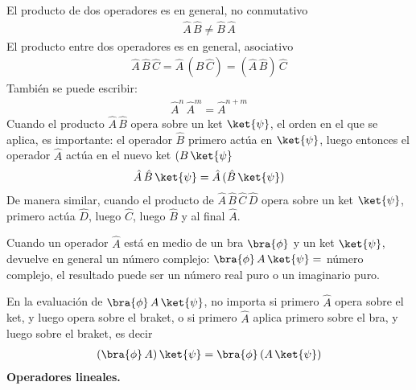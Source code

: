 El producto de dos operadores es en general, no conmutativo
\begin{align}
\hat{A} \, \hat{B} \neq \hat{B} \, \hat{A}
\label{eq:ecuacion_02_53}
\end{align}
El producto entre dos operadores es en general, asociativo
\begin{align}
\hat{A} \, \hat{B} \, \hat{C} =  \hat{A} \, (\hat{B} \, \hat{C}) = (\hat{A} \, \hat{B}) \, \hat{C} 
\label{eq:ecuacion_02_54}
\end{align}
También se puede escribir:
\begin{align*}
\hat{A}^{n} \, \hat{A}^{m} = \hat{A}^{n + m}
\end{align*}
Cuando el producto $\hat{A} \, \hat{B}$ opera sobre un ket $\ket{\psi}$, el orden en el que se aplica, es importante: el operador $\hat{B}$ primero actúa en $\ket{\psi}$, luego entonces el operador $\hat{A}$ actúa en el nuevo ket $(B \, \ket{\psi}$
\begin{align}
\hat{A} \, \hat{B} \, \ket{\psi} = \hat{A} \, (\hat{B} \, \ket{\psi})
\label{eq:ecuacion_02_55}
\end{align}
De manera similar, cuando el producto de $\hat{A} \, \hat{B} \, \hat{C} \, \hat{D}$ opera sobre un ket $\ket{\psi}$, primero actúa $\hat{D}$, luego $\hat{C}$, luego $\hat{B}$ y al final $\hat{A}$.
\par
Cuando un operador $\hat{A}$ está en medio de un bra $\bra{\phi}$ y un ket $\ket{\psi}$, devuelve en general un número complejo: $\bra{\phi} \, A \, \ket{\psi} =$ número complejo, el resultado puede ser un número real puro o un imaginario puro.
\par
En la evaluación de $\bra{\phi} \, A \, \ket{\psi}$, no importa si primero $\hat{A}$ opera sobre el ket, y luego opera sobre el braket, o si primero $\hat{A}$ aplica primero sobre el bra, y luego sobre el braket, es decir
\begin{align*}
(\bra{\phi} \, A) \, \ket{\psi} = \bra{\phi} \, (A \, \ket{\psi})
\end{align*}
\textbf{Operadores lineales.}

